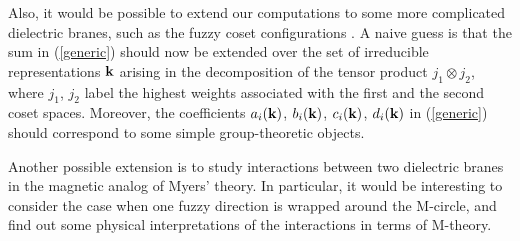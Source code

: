 \documentclass[a4paper,12pt]{article}
\begin{document}
{Also, it would be possible to extend our computations to some more complicated dielectric branes, such as the fuzzy coset configurations \cite{TV}. A naive guess is that the sum in (\ref{generic}) should now be extended over the set of irreducible representations $\bf k$ arising in the decomposition of the tensor product $j_{1}\otimes j_{2}$, where $j_{1}$, $j_{2}$ label the highest weights associated with the first and the second coset spaces. Moreover, the coefficients $a_{i}({\bf k})$, $b_{i}({\bf k})$, $c_{i}({\bf k})$, $d_{i}({\bf k})$ in (\ref{generic}) should correspond to some simple group-theoretic objects. 

Another possible extension is to study interactions between two dielectric branes in the magnetic analog \cite{DTV} of Myers' theory. In particular, it would be interesting to consider the case when one fuzzy direction is wrapped around the M-circle, and find out some physical interpretations of the interactions in terms of M-theory.
}
\end{document}
